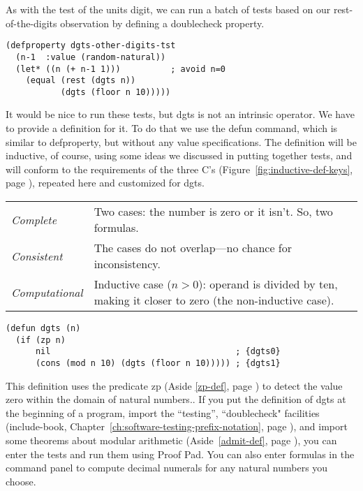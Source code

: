 As with the test of the units digit,
we can run a batch of tests based on our rest-of-the-digits
observation by defining a doublecheck property.
\begin{Verbatim}
(defproperty dgts-other-digits-tst
  (n-1  :value (random-natural))
  (let* ((n (+ n-1 1)))          ; avoid n=0
    (equal (rest (dgts n))
           (dgts (floor n 10)))))
\end{Verbatim}

It would be nice to run these tests, but dgts is not an intrinsic operator.
We have to provide a definition for it.
To do that we use the defun command, which is similar to defproperty,
but without any value specifications. The definition will be inductive,
of course, using some ideas we discussed in putting together tests,
and will conform to the requirements of the three C's 
(Figure~\ref{fig:inductive-def-keys}, page \pageref{fig:inductive-def-keys}), 
repeated here and customized for dgts.
\begin{samepage}
\begin{center}
\begin{tabular}{lp{3.5in}}
\emph{Complete}      & Two cases: the number is zero or it isn't. So, two formulas.\\
\emph{Consistent}    & The cases do not overlap---no chance for inconsistency.\\
\emph{Computational} & Inductive case ($n > 0$): operand is
                       divided by ten, making it closer to zero
                       (the non-inductive case).
\end{tabular}
\end{center}
\end{samepage}

\label{dgts-defun}
\begin{Verbatim}
(defun dgts (n)
  (if (zp n)
      nil                                     ; {dgts0}
      (cons (mod n 10) (dgts (floor n 10))))) ; {dgts1}
\end{Verbatim}

This definition uses the predicate zp (Aside \ref{zp-def}, page \pageref{zp-def})
to detect the value zero within the domain of natural numbers..
If you put the definition of dgts at the beginning of a program,
import the ``testing'', ``doublecheck" facilities
(include-book, 
Chapter~\ref{ch:software-testing-prefix-notation}, page \pageref{ch:software-testing-prefix-notation}), 
and import some theorems about modular arithmetic
(Aside~\ref{admit-def}, page \pageref{admit-def}),
you can enter the tests and run them using Proof Pad.
You can also enter formulas in the command panel to compute
decimal numerals for any natural numbers you choose.

